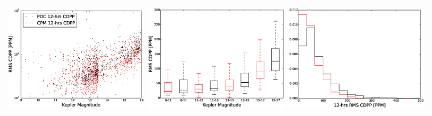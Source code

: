 \begin{figure}[p]
\begin{center}
\includegraphics[width=0.32\textwidth]{figures/cpm/f6g}
\includegraphics[width=0.32\textwidth]{figures/cpm/f6h}
\includegraphics[width=0.32\textwidth]{figures/cpm/f6i}


\end{center}
\end{figure}

